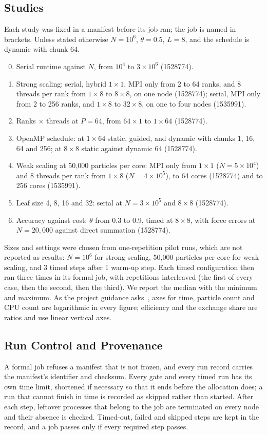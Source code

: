\documentclass[10pt,a4paper,twocolumn,twoside]{rho-class/rho}
\begin{document}
\subsection{Studies}
\label{sec:studies}
Each study was fixed in a manifest before its job ran; the job is named in brackets. Unless stated otherwise $N=10^6$, $\theta=0.5$, $L=8$, and the schedule is dynamic with chunk 64.
\begin{enumerate}[noitemsep]
\setcounter{enumi}{-1}
\item Serial runtime against $N$, from $10^4$ to $3\times10^6$ (1528774).
\item Strong scaling: serial, hybrid $1\times1$, MPI only from 2 to 64 ranks, and 8 threads per rank from $1\times8$ to $8\times8$, on one node (1528774); serial, MPI only from 2 to 256 ranks, and $1\times8$ to $32\times8$, on one to four nodes (1535991).
\item Ranks $\times$ threads at $P=64$, from $64{\times}1$ to $1{\times}64$ (1528774).
\item OpenMP schedule: at $1\times64$ static, guided, and dynamic with chunks 1, 16, 64 and 256; at $8\times8$ static against dynamic 64 (1528774).
\item Weak scaling at 50{,}000 particles per core: MPI only from $1\times1$ ($N=5\times10^4$) and 8 threads per rank from $1\times8$ ($N=4\times10^5$), to 64 cores (1528774) and to 256 cores (1535991).
\item Leaf size 4, 8, 16 and 32: serial at $N=3\times10^5$ and $8\times8$ (1528774).
\item Accuracy against cost: $\theta$ from 0.3 to 0.9, timed at $8\times8$, with force errors at $N=20{,}000$ against direct summation (1528774).
\end{enumerate}
Sizes and settings were chosen from one-repetition pilot runs, which are not reported as results: $N=10^6$ for strong scaling, 50{,}000 particles per core for weak scaling, and 3 timed steps after 1 warm-up step. Each timed configuration then ran three times in its formal job, with repetitions interleaved (the first of every case, then the second, then the third). We report the median with the minimum and maximum. As the project guidance asks~\cite{Lecture12}, axes for time, particle count and CPU count are logarithmic in every figure; efficiency and the exchange share are ratios and use linear vertical axes.

\subsection{Run Control and Provenance}
A formal job refuses a manifest that is not frozen, and every run record carries the manifest's identifier and checksum. Every gate and every timed run has its own time limit, shortened if necessary so that it ends before the allocation does; a run that cannot finish in time is recorded as skipped rather than started. After each step, leftover processes that belong to the job are terminated on every node and their absence is checked. Timed-out, failed and skipped steps are kept in the record, and a job passes only if every required step passes.
\end{document}
